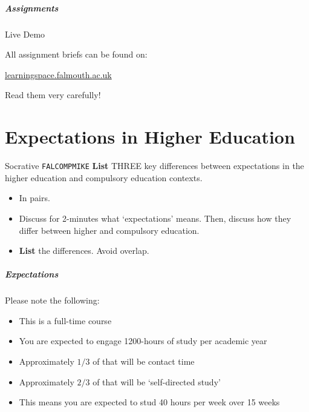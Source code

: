 \begin{frame}
	\frametitle{Assignments}
	
	Live Demo
	
	\vspace{3em}
	
	All assignment briefs can be found on:
	
	\vspace{0.5em}
	
	\indent \url{learningspace.falmouth.ac.uk}
	
	\vspace{0.5em}
	
	Read them very carefully!
	
\end{frame}

\part{Expectations in Higher Education}
\frame{\partpage}

\begin{frame}{Socrative \texttt{FALCOMPMIKE}}
	\textbf{List} THREE key differences between expectations in the higher education and compulsory education contexts.
	
	\begin{itemize}
		\item In pairs.
		\item Discuss for 2-minutes what `expectations' means. Then, discuss how they differ between higher and compulsory education.
		\item \textbf{List} the differences. Avoid overlap.
	\end{itemize}
\end{frame}

\begin{frame}
	\frametitle{Expectations}
	
	Please note the following:
	
	\begin{itemize}
		\item This is a full-time course
		\item You are expected to engage 1200-hours of study per academic year
		\item Approximately $1/3$ of that will be contact time
		\item Approximately $2/3$ of that will be `self-directed study'
		\item This means you are expected to stud 40 hours per week over 15 weeks
	\end{itemize}

\end{frame}

